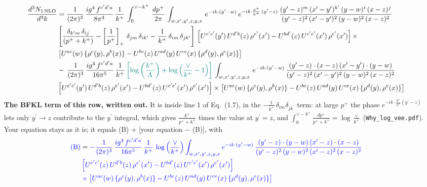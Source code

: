 \documentclass[9pt]{article}
\numberwithin{equation}{section}
\begin{document}
\begin{align}
     \frac{d^{3}N_{1\,\rm NLO}}{d^{3}k} & = \frac{1}{(2\pi)^{3}}\, \frac{ig^{4}\,f^{c'd'a}}{8\pi^{4}}\, \frac{1}{k^{+}}\,\int_{0}^{\vee-k^{+}}\,  \frac{dp^{+}}{2\pi}\, \int_{w,x',y',z,y,x}\, e^{-ik\cdot (y'-w)}\, e^{-ik\cdot \frac{p^{+}}{k^{+}}\,(y'-z)}\,\frac{(y'-z)^{m}\,(x'-y')^{k'}\,(y-w)^{i}\,(x-z)^{j}}{(y'-z)^{2}\,(x'-y')^{2}\,(y-w)^{2}\,(x-z)^{2}}\notag \\ & \left[\frac{\delta_{k'm}\,\delta_{ij}}{(p^{+}+k^{+})}-\left[\frac{1}{p^{+}}\right]_{+}\,\delta_{jm}\,\delta_{ik'}-\frac{1}{k^{+}}\, \delta_{im}\, \delta_{jk'}\right]\, \left[U^{e'c'}(y')\,U^{d'b}(z)\,\rho^{e'}(x')-U^{bd'}(z)\,U^{c'e'}(x')\,\rho^{e'}(x')\right]\times\notag \\ &  \left[U^{ac}(w)\, \{\rho^{c}(y),\rho^{b}(x)\}-U^{bc}(z)\,U^{ad}(y)\,U^{ce}(x)\,\{\rho^{d}(y),\rho^{e}(x)\}\right]\notag \\ & -\,\frac{1}{(2\pi)^{3}}\, \frac{ig^{4}\,f^{c'd'a}}{16\pi^{5}}\, \frac{1}{k^{+}}\,{\color{teal}\left[\log{\left(\frac{k^{+}}{\Lambda}\right)}+\log{\left(\frac{\vee}{k^{+}}-1\right)}\right]}\, \int_{w,x',y',z,y,x}\, e^{-ik\cdot (y'-w)}\,\frac{(y'-z)\cdot (x-z)\,(x'-y')\cdot (y-w)}{(y'-z)^{2}\,(x'-y')^{2}\,(y-w)^{2}\,(x-z)^{2}}\notag \\ &  \left[U^{e'c'}(y')\,U^{d'b}(z)\,\rho^{e'}(x')-U^{bd'}(z)\,U^{c'e'}(x')\,\rho^{e'}(x')\right]\times  \left[U^{ac}(w)\, \{\rho^{c}(y),\rho^{b}(x)\}-U^{bc}(z)\,U^{ad}(y)\,U^{ce}(x)\,\{\rho^{d}(y),\rho^{e}(x)\}\right]
\end{align} 
{\color{blue}\noindent\textbf{The BFKL term of this row, written out.} It is inside line 1 of Eq.~(1.7), in the $-\frac{1}{k^+}\,\delta_{im}\delta_{jk^\prime}$ term: at large $p^+$ the phase $e^{-ik\cdot\frac{p^+}{k^+}(y^\prime-z)}$ lets only $y^\prime\to z$ contribute to the $y^\prime$ integral, which gives $\frac{k^+}{p^++k^+}$ times the value at $y^\prime=z$, and $\int_0^{\vee-k^+}\frac{dp^+}{p^++k^+}=\log\frac{\vee}{k^+}$ (\texttt{Why\_log\_vee.pdf}). Your equation stays as it is; it equals (B) $+$ [your equation $-$ (B)], with}
\begin{align*}
{\color{blue}\text{(B)}} &= \color{blue}-\frac{1}{(2\pi)^{3}}\, \frac{ig^{4}\,f^{c'd'a}}{16\pi^{5}}\, \frac{1}{k^{+}}\,\log{\left(\frac{\vee}{k^{+}}\right)}\int_{w,x',y',z,y,x} e^{-ik\cdot (y'-w)}\,\frac{(y'-z)\cdot (y-w)\,(x'-z)\cdot (x-z)}{(y'-z)^{2}\,(y-w)^{2}\,(x'-z)^{2}\,(x-z)^{2}}\notag \\
& \color{blue}  \left[U^{e'c'}(z)\,U^{d'b}(z)\,\rho^{e'}(x')-U^{bd'}(z)\,U^{c'e'}(x')\,\rho^{e'}(x')\right]\notag \\
& \color{blue}  \times\left[U^{ac}(w)\, \{\rho^{c}(y),\rho^{b}(x)\}-U^{bc}(z)\,U^{ad}(y)\,U^{ce}(x)\,\{\rho^{d}(y),\rho^{e}(x)\}\right]
\end{align*}
\end{document}
